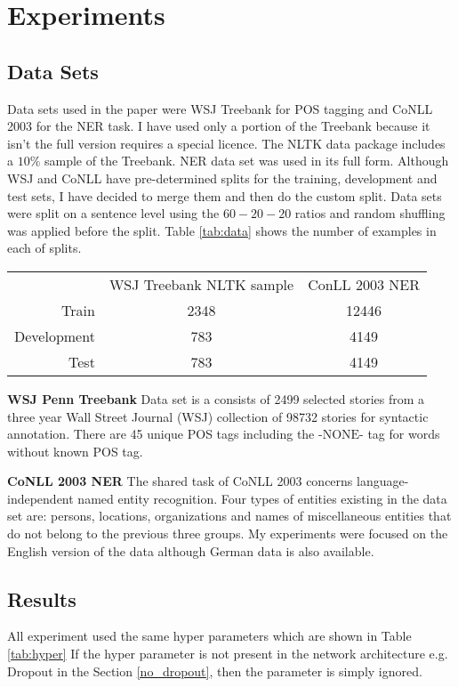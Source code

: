 \section{Experiments}

\subsection{Data Sets}
Data sets used in the paper were WSJ Treebank for POS tagging and CoNLL 2003
for the NER task. I have used only a portion of the Treebank because it isn't
the full version requires a special licence. The NLTK data package includes a
$10\%$ sample of the Treebank. NER data set was used in its full form.
Although WSJ and CoNLL have  pre-determined splits for the training,
development and test sets, I have decided to merge them and then do the custom
split. Data sets were split on a sentence level using the $60 - 20 - 20$ ratios
and random shuffling was applied before the split. Table \ref{tab:data} shows
the number of examples in each of splits.

\begin{center}
\begin{tabular}{ r|c|c| }
\multicolumn{1}{r}{}
 &  \multicolumn{1}{c}{WSJ Treebank NLTK sample}
 & \multicolumn{1}{c}{ConLL 2003 NER} \\
\cline{2-3}
Train & 2348 & 12446 \\
\cline{2-3}
Development & 783 & 4149 \\
\cline{2-3}
Test & 783 & 4149 \\
\cline{2-3}
\end{tabular}
\label{tab:data}
\end{center}


\textbf{WSJ Penn Treebank}
Data set is a consists of 2499 selected stories from a three year Wall Street
Journal (WSJ) collection of 98732 stories for syntactic annotation. There are
45 unique POS tags including the $\text{-NONE-}$ tag for words without known POS tag. 

\textbf{CoNLL 2003 NER}
The shared task of CoNLL 2003 concerns language-independent named entity
recognition. Four types of entities existing in the data set are: persons,
locations, organizations and names of miscellaneous entities that do not belong
to the previous three groups. My experiments were focused on the English
version of the data although German data is also available.

\subsection{Results}
All experiment used the same hyper parameters which are shown in Table
\ref{tab:hyper} If the hyper parameter is not present in the network
architecture e.g. Dropout in the Section \ref{no_dropout}, then the parameter
is simply ignored. 

